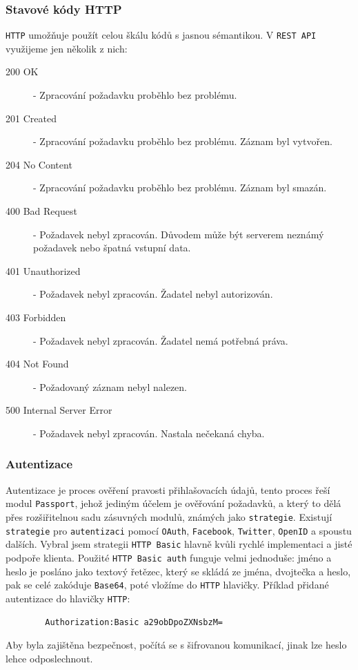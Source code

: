 \documentclass[czech,BP]{thesiskiv}
\begin{document}
			\subsubsection{Stavové kódy HTTP}
			\texttt{HTTP} umožňuje použít celou škálu kódů s jasnou sémantikou. V \texttt{REST API} využijeme jen několik z nich:
\begin{description}
\item [200 OK] - Zpracování požadavku proběhlo bez problému.
\item [201 Created] - Zpracování požadavku proběhlo bez problému. Záznam byl vytvořen. 
\item [204 No Content] - Zpracování požadavku proběhlo bez problému. Záznam byl smazán.
\item [400 Bad Request] - Požadavek nebyl zpracován. Důvodem může být serverem neznámý požadavek nebo špatná vstupní data.
\item [401 Unauthorized] - Požadavek nebyl zpracován. Žadatel nebyl autorizován.
\item [403 Forbidden] - Požadavek nebyl zpracován. Žadatel nemá potřebná práva.
\item [404 Not Found] - Požadovaný záznam nebyl nalezen.
\item [500 Internal Server Error] - Požadavek nebyl zpracován. Nastala nečekaná chyba.
\end{description}

	\subsubsection{Autentizace}
		Autentizace je proces ověření pravosti přihlašovacích údajů, tento proces řeší modul \texttt{Passport}, jehož jediným účelem je ověřování požadavků, a který to dělá přes rozšiřitelnou sadu zásuvných modulů, známých jako \texttt{strategie}. 
		Existují \texttt{strategie} pro \texttt{autentizaci} pomocí \texttt{OAuth}, \texttt{Facebook}, \texttt{Twitter}, \texttt{OpenID} a spoustu dalších.		
		Vybral jsem strategii \texttt{HTTP Basic} hlavně kvůli rychlé implementaci a jisté podpoře klienta.
		Použité \texttt{HTTP Basic auth} funguje velmi jednoduše: jméno a heslo je posláno jako textový řetězec, který se skládá ze jména, dvojtečka a heslo, pak se celé zakóduje \texttt{Base64}, poté vložíme do \texttt{HTTP} hlavičky.
Příklad přidané autentizace do hlavičky \texttt{HTTP}:
\begin{verbatim}
		Authorization:Basic a29obDpoZXNsbzM=
\end{verbatim}
Aby byla zajištěna bezpečnost, počítá se s šifrovanou komunikací, jinak lze heslo lehce odposlechnout.
\end{document}

